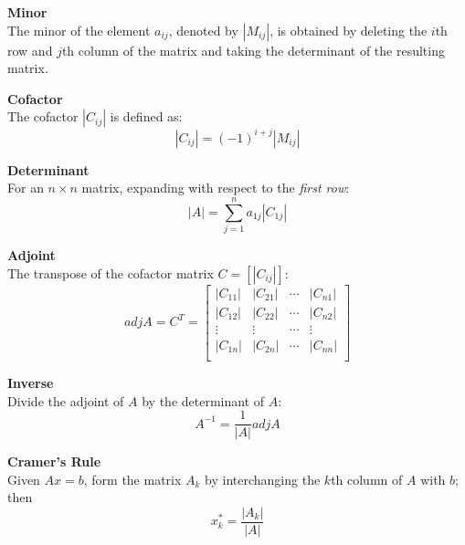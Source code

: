 \documentclass{./../../latex/tests}
\begin{document}
\thispagestyle{plain}
\vspace{-1.2em}
\setlength{\parskip}{2.2mm}

\textbf{Minor}\\
The minor of the element $a_{ij}$, denoted by $|M_{ij}|$, is obtained by deleting the $i$th row and $j$th column of the matrix and taking the determinant of the resulting matrix.

\textbf{Cofactor}\\
The cofactor $|C_{ij}|$ is defined as:
\[ |C_{ij}| = (-1)^{i+j} |M_{ij}| \]

\textbf{Determinant}\\
For an $n \times n$ matrix, expanding with respect to the \textit{first row}:
\[|A| = \sum_{j=1}^n a_{1j} |C_{1j}| \]

\textbf{Adjoint}\\
The transpose of the cofactor matrix $C = [|C_{ij}|]$:
\[adj A = C^T = \left[\begin{array}{llll}
|C_{11}| & |C_{21}| & \cdots & |C_{n1}| \\
|C_{12}| & |C_{22}| & \cdots &  |C_{n2}| \\
\vdots &\vdots & \cdots &  \vdots \\
|C_{1n}| & |C_{2n}| & \cdots & |C_{nn}| \\
\end{array}\right]\]

\textbf{Inverse}\\
Divide the adjoint of $A$ by the determinant of $A$:
\[ A^{-1} = \frac{1}{|A|} adj A\]

\textbf{Cramer's Rule}\\
Given $Ax = b$, form the matrix $A_k$ by interchanging the $k$th column of $A$ with $b$; then
\[x^*_k = \frac{|A_k|}{|A|}\]
\end{document}
